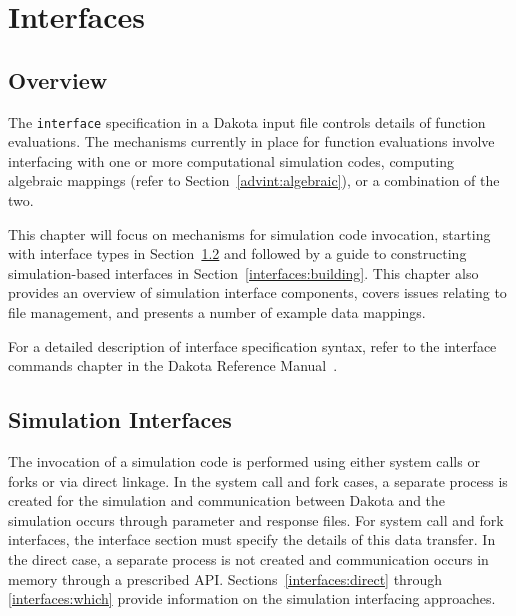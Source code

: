 \chapter{Interfaces}\label{interfaces}


\section{Overview}\label{interfaces:overview}

The \texttt{interface} specification in a Dakota input file controls
details of function evaluations. The mechanisms currently in place for
function evaluations involve interfacing with one or more
computational simulation codes, computing algebraic mappings (refer to
Section~\ref{advint:algebraic}), or a combination of the two.


This chapter will focus on mechanisms for simulation code invocation,
starting with interface types in Section~\ref{interfaces:sim} and
followed by a guide to constructing simulation-based interfaces in
Section~\ref{interfaces:building}.  This chapter also provides an
overview of simulation interface components, covers issues relating to
file management, and presents a number of example data mappings.

For a detailed description of interface specification syntax, refer to
the interface commands chapter in the Dakota Reference Manual~\cite{RefMan}.


\section{Simulation Interfaces}\label{interfaces:sim}

The invocation of a simulation code is performed using either system
calls or forks or via direct linkage. In the system call and fork
cases, a separate process is created for the simulation and
communication between Dakota and the simulation occurs through
parameter and response files. For system call and fork interfaces, the
interface section must specify the details of this data transfer.  In
the direct case, a separate process is not created and communication
occurs in memory through a prescribed API.
Sections~\ref{interfaces:direct} through \ref{interfaces:which}
provide information on the simulation interfacing approaches.

